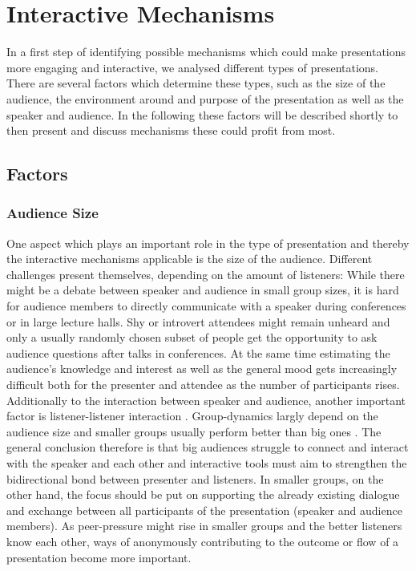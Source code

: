 \chapter{Interactive Mechanisms}
\label{cha:mechanisms}

In a first step of identifying possible mechanisms which could make presentations more engaging and interactive, we analysed different types of presentations. There are several factors which determine these types, such as the size of the audience, the environment around and purpose of the presentation as well as the speaker and audience. In the following these factors will be described shortly to then present and discuss mechanisms these could profit from most.

\section{Factors}

\subsection{Audience Size}
One aspect which plays an important role in the type of presentation and thereby the interactive mechanisms applicable is the size of the audience. Different challenges present themselves, depending on the amount of listeners: While there might be a debate between speaker and audience in small group sizes, it is hard for audience members to directly communicate with a speaker during conferences or in large lecture halls. Shy or introvert attendees might remain unheard \cite{Bry:Backstage} and only a usually randomly chosen subset of people get the opportunity to ask audience questions after talks in conferences. At the same time estimating the audience's knowledge and interest as well as the general mood gets increasingly difficult both for the presenter and attendee as the number of participants rises. Additionally to the interaction between speaker and audience, another important factor is listener-listener interaction \cite{Moore:ThreeTypesOfInteraction}. Group-dynamics largly depend on the audience size and smaller groups usually perform better than big ones \cite{Phillips:GroupProblemSolving}.
The general conclusion therefore is that big audiences struggle to connect and interact with the speaker and each other and interactive tools must aim to strengthen the bidirectional bond between presenter and listeners. In smaller groups, on the other hand, the focus should be put on supporting the already existing dialogue and exchange between all participants of the presentation (speaker and audience members). As peer-pressure might rise in smaller groups and the better listeners know each other, ways of anonymously contributing to the outcome or flow of a presentation become more important.

